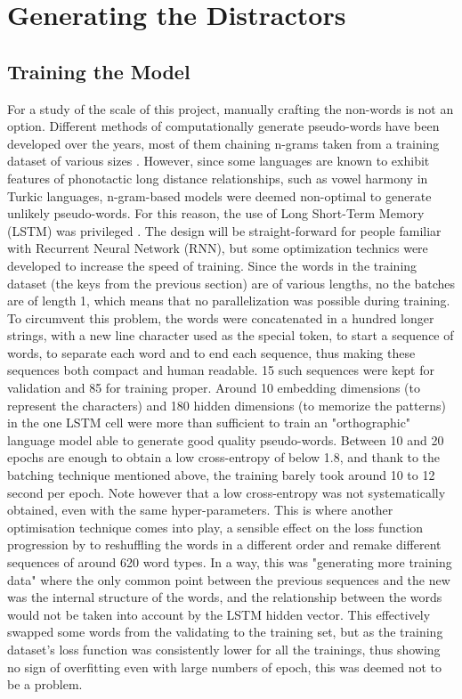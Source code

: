 \section{Generating the Distractors}
    \subsection{Training the Model}
For a study of the scale of this project, manually crafting the non-words is not an option. Different methods of computationally generate pseudo-words have been developed over the years, most of them chaining n-grams taken from a training dataset of various sizes \parencite{new_unipseudo_2023, keuleers_wuggy_2010}. However, since some languages are known to exhibit features of phonotactic long distance relationships, such as vowel harmony in Turkic languages, n-gram-based models were deemed non-optimal to generate unlikely pseudo-words. For this reason, the use of Long Short-Term Memory (LSTM) was privileged \parencite{hochreiter_long_1997}. The design will be straight-forward for people familiar with Recurrent Neural Network (RNN), but some optimization technics were developed to increase the speed of training. Since the words in the training dataset (the keys from the previous section) are of various lengths, no the batches are of length 1, which means that no parallelization was possible during training. To circumvent this problem, the words were concatenated in a hundred longer strings, with a new line character used as the special token, to start a sequence of words, to separate each word and to end each sequence, thus making these sequences both compact and human readable. 15 such sequences were kept for validation and 85 for training proper. Around 10 embedding dimensions (to represent the characters) and 180 hidden dimensions (to memorize the patterns) in the one LSTM cell were more than sufficient to train an "orthographic" language model able to generate good quality pseudo-words. Between 10 and 20 epochs are enough to obtain a low cross-entropy of below 1.8, and thank to the batching technique mentioned above, the training barely took around 10 to 12 second per epoch. Note however that a low cross-entropy was not systematically obtained, even with the same hyper-parameters. This is where another optimisation technique comes into play, a sensible effect on the loss function progression by to reshuffling the words in a different order and remake different sequences of around 620 word types. In a way, this was "generating more training data" where the only common point between the previous sequences and the new was the internal structure of the words, and the relationship between the words would not be taken into account by the LSTM hidden vector. This effectively swapped some words from the validating to the training set, but as the training dataset's loss function was consistently lower for all the trainings, thus showing no sign of overfitting even with large numbers of epoch, this was deemed not to be a problem.

